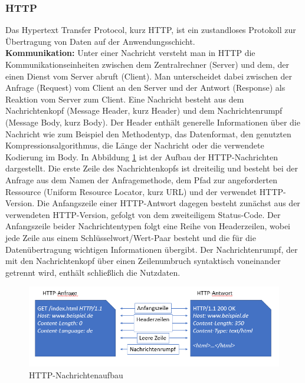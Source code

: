 \noindent
\subsubsection{HTTP}
Das Hypertext Transfer Protocol, kurz HTTP, ist ein zustandloses Protokoll zur Übertragung von Daten auf der Anwendungsschicht. \\

\noindent
{}
\textbf{Kommunikation:}
Unter einer Nachricht versteht man in HTTP die Kommunikationseinheiten zwischen dem Zentralrechner (Server) und dem, der einen Dienst vom Server abruft (Client). 
Man unterscheidet dabei zwischen der Anfrage (Request) vom Client an den Server und der Antwort (Response) als Reaktion vom Server zum Client. 
\newline
\noindent
Eine Nachricht besteht aus dem Nachrichtenkopf (Message Header, kurz Header) und dem Nachrichtenrumpf (Message Body, kurz Body). 
Der Header enthält generelle Informationen über die Nachricht wie zum Beispiel den Methodentyp, das Datenformat, den genutzten Kompressionsalgorithmus, die Länge der Nachricht oder die verwendete Kodierung im Body. 
\newline
\noindent
In Abbildung \ref{fig:HTTPNachricht} ist der Aufbau der HTTP-Nachrichten dargestellt.
Die erste Zeile des Nachrichtenkopfs ist dreiteilig und besteht bei der Anfrage aus dem Namen der Anfragemethode, dem Pfad zur angeforderten Ressource (Uniform Resource Locator, kurz URL) und der verwendet HTTP-Version. Die Anfangszeile einer HTTP-Antwort dagegen besteht zunächst aus der verwendeten HTTP-Version, gefolgt von dem zweiteiligem Status-Code. 
Der Anfangszeile beider Nachrichtentypen folgt eine Reihe von Headerzeilen, wobei jede Zeile aus einem Schlüsselwort/Wert-Paar besteht und die für die Datenübertragung wichtigen Informationen übergibt. 
Der Nachrichtenrumpf, der mit den Nachrichtenkopf über einen Zeilenumbruch syntaktisch voneinander getrennt wird, enthält schließlich die Nutzdaten.
\newline

\begin{figure}[tbt]
\centering
\includegraphics[width=\textwidth]{images/netzwerkprotokolle_http.PNG}
\caption{HTTP-Nachrichtenaufbau}
\label{fig:HTTPNachricht}
\end{figure}

